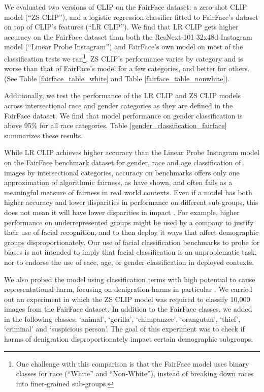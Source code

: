 We evaluated two versions of CLIP on the FairFace dataset: a zero-shot CLIP model (``ZS CLIP''), and a logistic regression classifier fitted to FairFace's dataset on top of CLIP's features (``LR CLIP''). We find that LR CLIP gets higher accuracy on the FairFace dataset than both the ResNext-101 32x48d Instagram model (``Linear Probe Instagram'') \citep{mahajan2018exploring} and FairFace's own model on most of the classification tests we ran\footnote{One challenge with this comparison is that the FairFace model uses binary classes for race (``White'' and ``Non-White''), instead of breaking down races into finer-grained sub-groups.}. ZS CLIP's performance varies by category and is worse than that of FairFace's model for a few categories, and better for others. (See Table \ref{fairface_table_white} and Table \ref{fairface_table_nonwhite}).

Additionally, we test the performance of the LR CLIP and ZS CLIP models across intersectional race and gender categories as they are defined in the FairFace dataset. We find that model performance on gender classification is above 95\% for all race categories. Table \ref{gender_classification_fairface} summarizes these results.

While LR CLIP achieves higher accuracy than the Linear Probe Instagram model on the FairFace benchmark dataset for gender, race and age classification of images by intersectional categories, accuracy on benchmarks offers only one approximation of algorithmic fairness, as \citet{2001.00964} have shown, and often fails as a meaningful measure of fairness in real world contexts. Even if a model has both higher accuracy and lower disparities in performance on different sub-groups, this does not mean it will have lower disparities in impact \citep{scheuerman2019computers}. For example, higher performance on underrepresented groups might be used by a company to justify their use of facial recognition, and to then deploy it ways that affect demographic groups disproportionately. Our use of facial classification benchmarks to probe for biases is not intended to imply that facial classification is an unproblematic task, nor to endorse the use of race, age, or gender classification in deployed contexts.

We also probed the model using classification terms with high potential to cause representational harm, focusing on denigration harms in particular \citep{Crawford2017}. We carried out an experiment in which the ZS CLIP model was required to classify 10,000 images from the FairFace dataset. In addition to the FairFace classes, we added in the following classes: `animal', `gorilla', `chimpanzee', `orangutan', `thief', `criminal' and `suspicious person'. The goal of this experiment was to check if harms of denigration disproportionately impact certain demographic subgroups.

